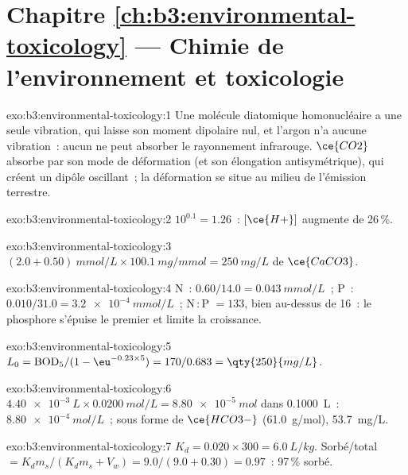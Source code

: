 \section*{Chapitre \ref{ch:b3:environmental-toxicology} --- Chimie de l'environnement et toxicologie}

\begin{solution}{exo:b3:environmental-toxicology:1}
Une molécule diatomique homonucléaire a une seule vibration, qui laisse son
moment dipolaire nul, et l'argon n'a aucune vibration~: aucun ne peut
absorber le rayonnement infrarouge. $\ce{CO2}$ absorbe par
son mode de déformation (et son élongation antisymétrique), qui créent un
dipôle oscillant~; la déformation se situe au milieu de l'émission
terrestre.
\end{solution}

\begin{solution}{exo:b3:environmental-toxicology:2}
$10^{0.1} = 1.26$~: $[\ce{H+}]$ augmente de 26\,\%.
\end{solution}

\begin{solution}{exo:b3:environmental-toxicology:3}
$(2.0 + 0.50)\ \unit{mmol/L} \times \qty{100.1}{mg/mmol} = \qty{250}{mg/L}$ de $\ce{CaCO3}$.
\end{solution}

\begin{solution}{exo:b3:environmental-toxicology:4}
N~: $0.60/14.0 = \qty{0.043}{mmol/L}$~; P~: $0.010/31.0 = \qty{3.2e-4}{mmol/L}$~; N\,:\,P $= 133$, bien au-dessus de 16~: le phosphore s'épuise
le premier et limite la croissance.
\end{solution}

\begin{solution}{exo:b3:environmental-toxicology:5}
$L_0 = \mathrm{BOD_5}/(1 - \eu^{-0.23 \times 5}) = 170/0.683 = \qty{250}{mg/L}$.
\end{solution}

\begin{solution}{exo:b3:environmental-toxicology:6}
$\qty{4.40e-3}{L} \times \qty{0.0200}{mol/L} = \qty{8.80e-5}{mol}$ dans \qty{0.1000}{L}~:  $\qty{8.80e-4}{mol/L}$~; sous forme de $\ce{HCO3-}$ (\qty{61.0}{g/mol}),
\qty{53.7}{mg/L}.
\end{solution}

\begin{solution}{exo:b3:environmental-toxicology:7}
$K_d = 0.020 \times 300 = \qty{6.0}{L/kg}$. Sorbé/total $= K_dm_s/(K_dm_s + V_w) = 9.0/(9.0 + 0.30) = 0.97$~: 97\,\% sorbé.
\end{solution}

